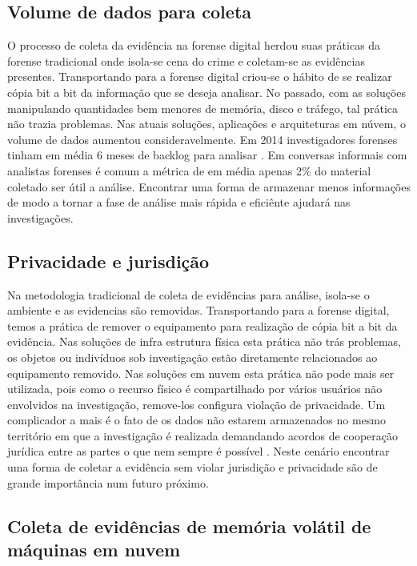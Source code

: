 \subsection{Volume de dados para coleta}
\label{sec:volumedados}

O processo de coleta da evidência na forense digital herdou suas práticas da forense tradicional onde isola-se cena do crime e coletam-se as evidências presentes. 
%
Transportando para a forense digital criou-se o hábito de se realizar cópia bit a bit da informação que se deseja analisar.
%
No passado, com as soluções manipulando quantidades bem menores de memória, disco e tráfego, tal prática não trazia problemas. Nas atuais soluções, aplicações e arquiteturas em núvem, o volume de dados aumentou consideravelmente.
%
Em 2014 investigadores forenses tinham em média 6 meses de backlog para analisar \cite{QuickIncreaseVolumeImpact:2014}. Em conversas informais com analistas forenses é comum a métrica de em média apenas 2\% do material coletado ser útil a análise.
%
Encontrar uma forma de armazenar menos informações de modo a tornar a fase de análise mais rápida e eficiênte ajudará nas investigações.

\subsection{Privacidade e jurisdição}
\label{sec:violacaoprivacidadejuriscdicao}

Na metodologia tradicional de coleta de evidências para análise, isola-se o ambiente e as evidencias são removidas. Transportando para a forense digital, temos a prática de remover o equipamento para realização de cópia bit a bit da evidência.
%
Nas soluções de infra estrutura física esta prática não trás problemas, os objetos ou indivíduos sob investigação estão diretamente relacionados ao equipamento removido.
%
Nas soluções em nuvem esta prática não pode mais ser utilizada, pois como o recurso físico é compartilhado por vários usuários não envolvidos na investigação, remove-los configura violação de privacidade.
%
Um complicador a mais é o fato de os dados não estarem armazenados no mesmo território em que a investigação é realizada demandando acordos de cooperação jurídica entre as partes o que nem sempre é possível \cite{SimouCloudChlng:2014}.
%
Neste cenário encontrar uma forma de coletar a evidência sem violar jurisdição e privacidade são de grande importância num futuro próximo.


\subsection{Coleta de evidências de memória volátil de máquinas em nuvem}
\label{sec:forensenuvem}

